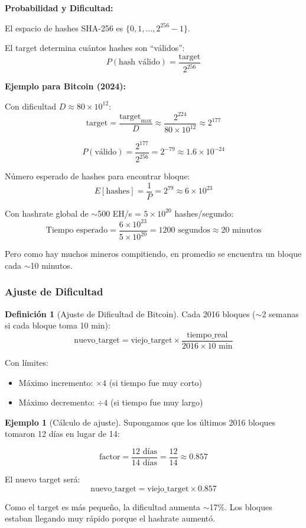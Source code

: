 \documentclass[11pt,a4paper,twoside,openright]{book}
\theoremstyle{definition}
\newtheorem{definition}{Definición}[chapter]
\newtheorem{example}{Ejemplo}[chapter]
\theoremstyle{plain}
\theoremstyle{remark}
\begin{document}
\begin{mathnote}
\textbf{Probabilidad y Dificultad:}

El espacio de hashes SHA-256 es $\{0, 1, \ldots, 2^{256}-1\}$.

El target determina cuántos hashes son ``válidos'':
\[ P(\text{hash válido}) = \frac{\text{target}}{2^{256}} \]

\textbf{Ejemplo para Bitcoin (2024):}

Con dificultad $D \approx 80 \times 10^{12}$:
\[ \text{target} = \frac{\text{target}_{\text{max}}}{D} \approx \frac{2^{224}}{80 \times 10^{12}} \approx 2^{177} \]

\[ P(\text{válido}) = \frac{2^{177}}{2^{256}} = 2^{-79} \approx 1.6 \times 10^{-24} \]

Número esperado de hashes para encontrar bloque:
\[ E[\text{hashes}] = \frac{1}{P} = 2^{79} \approx 6 \times 10^{23} \]

Con hashrate global de $\sim$500 EH/s = $5 \times 10^{20}$ hashes/segundo:
\[ \text{Tiempo esperado} = \frac{6 \times 10^{23}}{5 \times 10^{20}} = 1200 \text{ segundos} \approx 20 \text{ minutos} \]

Pero como hay muchos mineros compitiendo, en promedio se encuentra un bloque cada $\sim$10 minutos.
\end{mathnote}

\subsubsection{Ajuste de Dificultad}

\begin{definition}[Ajuste de Dificultad de Bitcoin]
Cada 2016 bloques ($\sim$2 semanas si cada bloque toma 10 min):
\[ \text{nuevo\_target} = \text{viejo\_target} \times \frac{\text{tiempo\_real}}{2016 \times 10 \text{ min}} \]

Con límites:
\begin{itemize}
    \item Máximo incremento: $\times 4$ (si tiempo fue muy corto)
    \item Máximo decremento: $\div 4$ (si tiempo fue muy largo)
\end{itemize}
\end{definition}

\begin{example}[Cálculo de ajuste]
Supongamos que los últimos 2016 bloques tomaron 12 días en lugar de 14:

\[ \text{factor} = \frac{12 \text{ días}}{14 \text{ días}} = \frac{12}{14} \approx 0.857 \]

El nuevo target será:
\[ \text{nuevo\_target} = \text{viejo\_target} \times 0.857 \]

Como el target es más pequeño, la dificultad aumenta $\sim$17\%. Los bloques estaban llegando muy rápido porque el hashrate aumentó.
\end{example}
\end{document}
